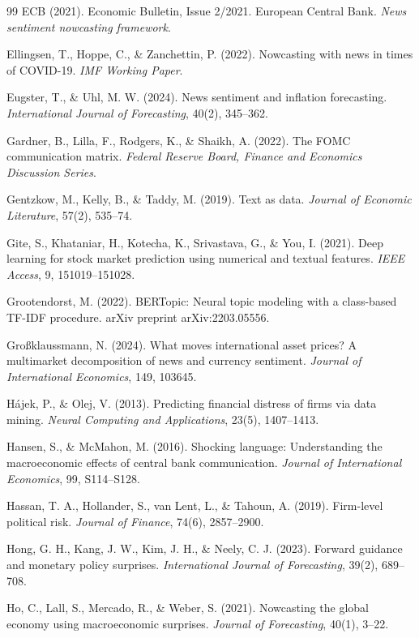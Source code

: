 \documentclass[11pt]{article}
\begin{document}
{{\begin{thebibliography}{99}
 ECB (2021). Economic Bulletin, Issue 2/2021. European Central Bank. \textit{News sentiment nowcasting framework}.

 Ellingsen, T., Hoppe, C., \& Zanchettin, P. (2022). Nowcasting with news in times of COVID-19. \textit{IMF Working Paper}.

 Eugster, T., \& Uhl, M. W. (2024). News sentiment and inflation forecasting. \textit{International Journal of Forecasting}, 40(2), 345--362.

 Gardner, B., Lilla, F., Rodgers, K., \& Shaikh, A. (2022). The FOMC communication matrix. \textit{Federal Reserve Board, Finance and Economics Discussion Series}.

 Gentzkow, M., Kelly, B., \& Taddy, M. (2019). Text as data. \textit{Journal of Economic Literature}, 57(2), 535--74.

 Gite, S., Khataniar, H., Kotecha, K., Srivastava, G., \& You, I. (2021). Deep learning for stock market prediction using numerical and textual features. \textit{IEEE Access}, 9, 151019--151028.

 Grootendorst, M. (2022). BERTopic: Neural topic modeling with a class-based TF-IDF procedure. arXiv preprint arXiv:2203.05556.

 Großklaussmann, N. (2024). What moves international asset prices? A multimarket decomposition of news and currency sentiment. \textit{Journal of International Economics}, 149, 103645.

 Hájek, P., \& Olej, V. (2013). Predicting financial distress of firms via data mining. \textit{Neural Computing and Applications}, 23(5), 1407--1413.

 Hansen, S., \& McMahon, M. (2016). Shocking language: Understanding the macroeconomic effects of central bank communication. \textit{Journal of International Economics}, 99, S114--S128.

 Hassan, T. A., Hollander, S., van Lent, L., \& Tahoun, A. (2019). Firm-level political risk. \textit{Journal of Finance}, 74(6), 2857--2900.

 Hong, G. H., Kang, J. W., Kim, J. H., \& Neely, C. J. (2023). Forward guidance and monetary policy surprises. \textit{International Journal of Forecasting}, 39(2), 689--708.

 Ho, C., Lall, S., Mercado, R., \& Weber, S. (2021). Nowcasting the global economy using macroeconomic surprises. \textit{Journal of Forecasting}, 40(1), 3--22.


\end{thebibliography}}}
\end{document}
